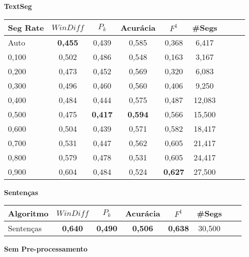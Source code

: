 \documentclass{article}
\begin{document}


{  
\large
\center
	\textbf{TextSeg}  

}

 \begin{longtable}[c]{|l|c|c|c|c|c|c|c|c|} 
\hline 
Seg Rate & $WinDiff$ & $P_k$ & Acurácia & $F^1$ & \#Segs\\ \hline 
Auto & \cellcolor{gray!20} \textbf{0,455} & 0,439 & 0,585 & 0,368 & 6,417  \\ \hline 
0,100 & 0,502 & 0,486 & 0,548 & 0,163 & 3,167  \\ \hline 
0,200 & 0,473 & 0,452 & 0,569 & 0,320 & 6,083  \\ \hline 
0,300 & 0,496 & 0,460 & 0,560 & 0,406 & 9,250  \\ \hline 
0,400 & 0,484 & 0,444 & 0,575 & 0,487 & 12,083  \\ \hline 
0,500 & 0,475 & \cellcolor{gray!20} \textbf{0,417} & \cellcolor{gray!20} \textbf{0,594} & 0,566 & 15,500  \\ \hline 
0,600 & 0,504 & 0,439 & 0,571 & 0,582 & 18,417  \\ \hline 
0,700 & 0,531 & 0,447 & 0,562 & 0,605 & 21,417  \\ \hline 
0,800 & 0,579 & 0,478 & 0,531 & 0,605 & 24,417  \\ \hline 
0,900 & 0,604 & 0,484 & 0,524 & \cellcolor{gray!20} \textbf{0,627} & 27,500  \\ \hline 
 \end{longtable} 





{  
\large
\center
	\textbf{Sentenças}  

}

\begin{longtable}[c]{|l|c|c|c|c|c|c|c|} 
\hline 
Algoritmo & $WinDiff$ & $P_k$ & Acurácia & $F^1$ & \#Segs\\ \hline 
Sentenças & \cellcolor{gray!20} \textbf{0,640} & \cellcolor{gray!20} \textbf{0,490} & \cellcolor{gray!20} \textbf{0,506} & \cellcolor{gray!20} \textbf{0,638} & 30,500  \\ \hline 
 \end{longtable} 



{  
\LARGE
\center
	\textbf{Sem Pre-processamento}  

}
\end{document}
